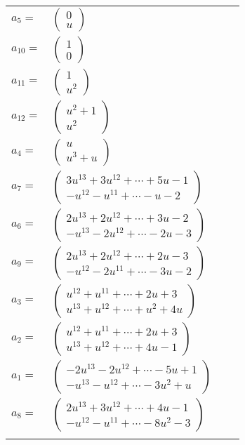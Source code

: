 \documentclass[1p]{elsarticle_modified}
\theoremstyle{definition}
\begin{document}
\begin{tabular}{m{7pt} m{180pt} m{7pt} m{180pt} }
\flushright $a_{5}=$&$\begin{pmatrix}0\\u\end{pmatrix}$ \\
\flushright $a_{10}=$&$\begin{pmatrix}1\\0\end{pmatrix}$ \\
\flushright $a_{11}=$&$\begin{pmatrix}1\\u^2\end{pmatrix}$ \\
\flushright $a_{12}=$&$\begin{pmatrix}u^2+1\\u^2\end{pmatrix}$ \\
\flushright $a_{4}=$&$\begin{pmatrix}u\\u^3+u\end{pmatrix}$ \\
\flushright $a_{7}=$&$\begin{pmatrix}3 u^{13}+3 u^{12}+\cdots+5 u-1\\- u^{12}- u^{11}+\cdots- u-2\end{pmatrix}$ \\
\flushright $a_{6}=$&$\begin{pmatrix}2 u^{13}+2 u^{12}+\cdots+3 u-2\\- u^{13}-2 u^{12}+\cdots-2 u-3\end{pmatrix}$ \\
\flushright $a_{9}=$&$\begin{pmatrix}2 u^{13}+2 u^{12}+\cdots+2 u-3\\- u^{12}-2 u^{11}+\cdots-3 u-2\end{pmatrix}$ \\
\flushright $a_{3}=$&$\begin{pmatrix}u^{12}+u^{11}+\cdots+2 u+3\\u^{13}+u^{12}+\cdots+u^2+4 u\end{pmatrix}$ \\
\flushright $a_{2}=$&$\begin{pmatrix}u^{12}+u^{11}+\cdots+2 u+3\\u^{13}+u^{12}+\cdots+4 u-1\end{pmatrix}$ \\
\flushright $a_{1}=$&$\begin{pmatrix}-2 u^{13}-2 u^{12}+\cdots-5 u+1\\- u^{13}- u^{12}+\cdots-3 u^2+u\end{pmatrix}$ \\
\flushright $a_{8}=$&$\begin{pmatrix}2 u^{13}+3 u^{12}+\cdots+4 u-1\\- u^{12}- u^{11}+\cdots-8 u^2-3\end{pmatrix}$\\&\end{tabular}
\end{document}
